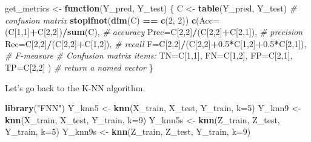 \documentclass[10pt,b5paper,krantz1]{krantz}
\newenvironment{Shaded}{\begin{snugshade}}{\end{snugshade}}
\newcommand{\CommentTok}[1]{\textcolor[rgb]{0.37,0.37,0.37}{\textit{#1}}}
\newcommand{\ControlFlowTok}[1]{\textcolor[rgb]{0.27,0.27,0.27}{\textbf{#1}}}
\newcommand{\DataTypeTok}[1]{\textcolor[rgb]{0.27,0.27,0.27}{#1}}
\newcommand{\DecValTok}[1]{\textcolor[rgb]{0.06,0.06,0.06}{#1}}
\newcommand{\FloatTok}[1]{\textcolor[rgb]{0.06,0.06,0.06}{#1}}
\newcommand{\KeywordTok}[1]{\textcolor[rgb]{0.27,0.27,0.27}{\textbf{#1}}}
\newcommand{\NormalTok}[1]{#1}
\newcommand{\OperatorTok}[1]{\textcolor[rgb]{0.43,0.43,0.43}{\textbf{#1}}}
\newcommand{\StringTok}[1]{\textcolor[rgb]{0.5,0.5,0.5}{#1}}
\begin{document}
\begin{Shaded}
\begin{Highlighting}[]
\NormalTok{get_metrics <-}\StringTok{ }\ControlFlowTok{function}\NormalTok{(Y_pred, Y_test)}
\NormalTok{\{}
\NormalTok{    C <-}\StringTok{ }\KeywordTok{table}\NormalTok{(Y_pred, Y_test) }\CommentTok{# confusion matrix}
    \KeywordTok{stopifnot}\NormalTok{(}\KeywordTok{dim}\NormalTok{(C) }\OperatorTok{==}\StringTok{ }\KeywordTok{c}\NormalTok{(}\DecValTok{2}\NormalTok{, }\DecValTok{2}\NormalTok{))}
    \KeywordTok{c}\NormalTok{(}\DataTypeTok{Acc=}\NormalTok{(C[}\DecValTok{1}\NormalTok{,}\DecValTok{1}\NormalTok{]}\OperatorTok{+}\NormalTok{C[}\DecValTok{2}\NormalTok{,}\DecValTok{2}\NormalTok{])}\OperatorTok{/}\KeywordTok{sum}\NormalTok{(C), }\CommentTok{# accuracy}
      \DataTypeTok{Prec=}\NormalTok{C[}\DecValTok{2}\NormalTok{,}\DecValTok{2}\NormalTok{]}\OperatorTok{/}\NormalTok{(C[}\DecValTok{2}\NormalTok{,}\DecValTok{2}\NormalTok{]}\OperatorTok{+}\NormalTok{C[}\DecValTok{2}\NormalTok{,}\DecValTok{1}\NormalTok{]), }\CommentTok{# precision}
      \DataTypeTok{Rec=}\NormalTok{C[}\DecValTok{2}\NormalTok{,}\DecValTok{2}\NormalTok{]}\OperatorTok{/}\NormalTok{(C[}\DecValTok{2}\NormalTok{,}\DecValTok{2}\NormalTok{]}\OperatorTok{+}\NormalTok{C[}\DecValTok{1}\NormalTok{,}\DecValTok{2}\NormalTok{]), }\CommentTok{# recall}
      \DataTypeTok{F=}\NormalTok{C[}\DecValTok{2}\NormalTok{,}\DecValTok{2}\NormalTok{]}\OperatorTok{/}\NormalTok{(C[}\DecValTok{2}\NormalTok{,}\DecValTok{2}\NormalTok{]}\OperatorTok{+}\FloatTok{0.5}\OperatorTok{*}\NormalTok{C[}\DecValTok{1}\NormalTok{,}\DecValTok{2}\NormalTok{]}\OperatorTok{+}\FloatTok{0.5}\OperatorTok{*}\NormalTok{C[}\DecValTok{2}\NormalTok{,}\DecValTok{1}\NormalTok{]), }\CommentTok{# F-measure}
      \CommentTok{# Confusion matrix items:}
      \DataTypeTok{TN=}\NormalTok{C[}\DecValTok{1}\NormalTok{,}\DecValTok{1}\NormalTok{], }\DataTypeTok{FN=}\NormalTok{C[}\DecValTok{1}\NormalTok{,}\DecValTok{2}\NormalTok{],}
      \DataTypeTok{FP=}\NormalTok{C[}\DecValTok{2}\NormalTok{,}\DecValTok{1}\NormalTok{], }\DataTypeTok{TP=}\NormalTok{C[}\DecValTok{2}\NormalTok{,}\DecValTok{2}\NormalTok{]}
\NormalTok{    ) }\CommentTok{# return a named vector}
\NormalTok{\}}
\end{Highlighting}
\end{Shaded}

Let's go back to the K-NN algorithm.

\begin{Shaded}
\begin{Highlighting}[]
\KeywordTok{library}\NormalTok{(}\StringTok{"FNN"}\NormalTok{)}
\NormalTok{Y_knn5   <-}\StringTok{ }\KeywordTok{knn}\NormalTok{(X_train, X_test, Y_train, }\DataTypeTok{k=}\DecValTok{5}\NormalTok{)}
\NormalTok{Y_knn9   <-}\StringTok{ }\KeywordTok{knn}\NormalTok{(X_train, X_test, Y_train, }\DataTypeTok{k=}\DecValTok{9}\NormalTok{)}
\NormalTok{Y_knn5s  <-}\StringTok{ }\KeywordTok{knn}\NormalTok{(Z_train, Z_test, Y_train, }\DataTypeTok{k=}\DecValTok{5}\NormalTok{)}
\NormalTok{Y_knn9s  <-}\StringTok{ }\KeywordTok{knn}\NormalTok{(Z_train, Z_test, Y_train, }\DataTypeTok{k=}\DecValTok{9}\NormalTok{)}
\end{Highlighting}
\end{Shaded}
\end{document}

